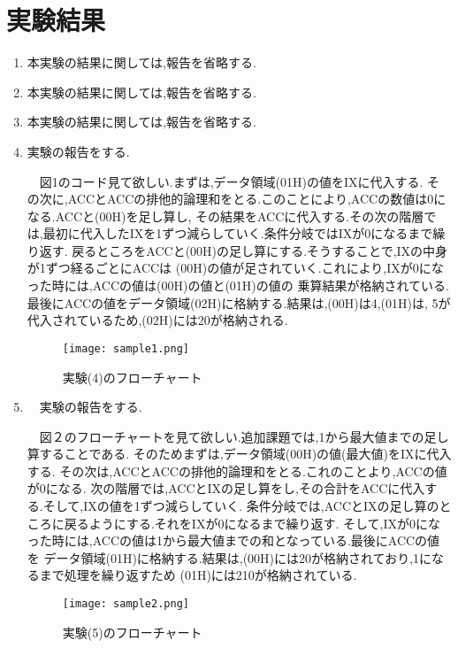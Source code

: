 \documentclass[a4paper,11pt,titlepage]{jarticle}
\begin{document}
 \section{実験結果}
 \begin{enumerate}
  \item 本実験の結果に関しては,報告を省略する.\par
  \item 本実験の結果に関しては,報告を省略する.\par
  \item 本実験の結果に関しては,報告を省略する.\par
  \item 実験の報告をする.\par
    　図1のコード見て欲しい.まずは,データ領域(01H)の値をIXに代入する.
    その次に,ACCとACCの排他的論理和をとる.このことにより,ACCの数値は0になる.ACCと(00H)を足し算し,
    その結果をACCに代入する.その次の階層では,最初に代入したIXを1ずつ減らしていく.条件分岐ではIXが0になるまで繰り返す.
    戻るところをACCと(00H)の足し算にする.そうすることで,IXの中身が1ずつ経るごとにACCは
    (00H)の値が足されていく.これにより,IXが0になった時には,ACCの値は(00H)の値と(01H)の値の
    乗算結果が格納されている.最後にACCの値をデータ領域(02H)に格納する.結果は,(00H)は4,(01H)は,
    5が代入されているため,(02H)には20が格納される.

\begin{figure}[htbp]
  \centering
  \texttt{[image: sample1.png]}
  \label{実験(4)のフローチャート}\\
  \caption{実験(4)のフローチャート}
\end{figure}

  
  \item　実験の報告をする.\par
    　図２のフローチャートを見て欲しい.追加課題では,1から最大値までの足し算することである.
    そのためまずは,データ領域(00H)の値(最大値)をIXに代入する.
    その次は,ACCとACCの排他的論理和をとる.これのことより,ACCの値が0になる.
    次の階層では,ACCとIXの足し算をし,その合計をACCに代入する.そして,IXの値を1ずつ減らしていく.
    条件分岐では,ACCとIXの足し算のところに戻るようにする.それをIXが0になるまで繰り返す.
    そして,IXが0になった時には,ACCの値は1から最大値までの和となっている.最後にACCの値を
    データ領域(01H)に格納する.結果は,(00H)には20が格納されており,1になるまで処理を繰り返すため
    (01H)には210が格納されている.
    \begin{figure}[htbp]
      \centering
      \texttt{[image: sample2.png]}
      \label{実験(5)のフローチャート}\\
      \caption{実験(5)のフローチャート}
    \end{figure}
 
 \end{enumerate}
\end{document}
